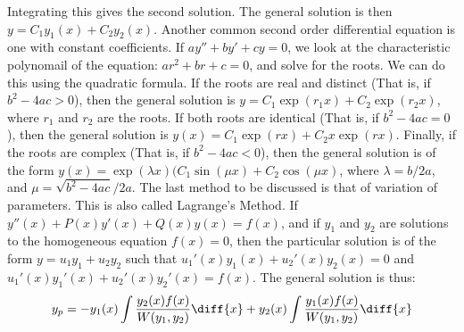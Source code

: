 \documentclass[crop=false,class=article,oneside]{standalone}
\begin{document}
        Integrating this gives the second solution.
        The general solution is then
        $y=C_{1}y_{1}(x)+C_{2}y_{2}(x)$. Another common
        second order differential equation is one with
        constant coefficients. If 
        $ay''+by'+cy=0$, we look at the characteristic
        polynomail of the equation:
        $ar^{2}+br+c=0$, and solve for the roots. We
        can do this using the quadratic formula. If
        the roots are real and distinct (That is,
        if $b^{2}-4ac>0$), then the general solution
        is $y=C_{1}\exp(r_{1}x)+C_{2}\exp(r_{2}x)$,
        where $r_{1}$ and $r_{2}$ are the roots. If
        both roots are identical (That is,
        if $b^{2}-4ac=0$), then the general solution
        is $y(x)=C_{1}\exp(rx)+C_{2}x\exp(rx)$. Finally,
        if the roots are complex (That is, if
        $b^{2}-4ac<0$), then the general solution is of
        the form
        $y(x)=\exp(\lambda{x})(C_{1}\sin(\mu{x})+C_{2}\cos(\mu{x})$,
        where $\lambda=b/2a$, and $\mu=\sqrt{b^{2}-4ac}/2a$.
        The last method to be discussed is that of
        variation of parameters. This is also called
        Lagrange's Method. If $y''(x)+P(x)y'(x)+Q(x)y(x)=f(x)$,
        and if $y_{1}$ and $y_{2}$ are solutions
        to the homogeneous equation $f(x)=0$, then the particular
        solution is of the form $y=u_{1}y_{1}+u_{2}y_{2}$ such
        that $u_{1}'(x)y_{1}(x)+u_{2}'(x)y_{2}(x)=0$
        and $u_{1}'(x)y_{1}'(x)+u_{2}'(x)y_{2}'(x)=f(x)$.
        The general solution is thus:
        \begin{equation*}
            y_{p}=
            -y_{1}(x)\int\frac{y_{2}(x)f(x)}{W(y_{1},y_{2})}\diff{x}
            +y_{2}(x)\int\frac{y_{1}(x)f(x)}{W(y_{1},y_{2})}\diff{x}
        \end{equation*}
\end{document}
